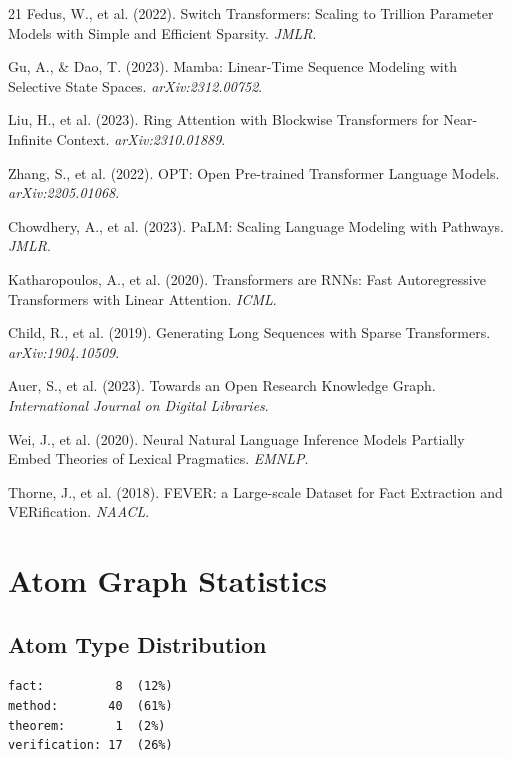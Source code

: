 \documentclass[11pt,a4paper]{article}
\begin{document}
\begin{thebibliography}{21}
Fedus, W., et al. (2022). Switch Transformers: Scaling to Trillion Parameter Models with Simple and Efficient Sparsity. \textit{JMLR}.

Gu, A., \& Dao, T. (2023). Mamba: Linear-Time Sequence Modeling with Selective State Spaces. \textit{arXiv:2312.00752}.

Liu, H., et al. (2023). Ring Attention with Blockwise Transformers for Near-Infinite Context. \textit{arXiv:2310.01889}.

Zhang, S., et al. (2022). OPT: Open Pre-trained Transformer Language Models. \textit{arXiv:2205.01068}.

Chowdhery, A., et al. (2023). PaLM: Scaling Language Modeling with Pathways. \textit{JMLR}.

Katharopoulos, A., et al. (2020). Transformers are RNNs: Fast Autoregressive Transformers with Linear Attention. \textit{ICML}.

Child, R., et al. (2019). Generating Long Sequences with Sparse Transformers. \textit{arXiv:1904.10509}.

Auer, S., et al. (2023). Towards an Open Research Knowledge Graph. \textit{International Journal on Digital Libraries}.

Wei, J., et al. (2020). Neural Natural Language Inference Models Partially Embed Theories of Lexical Pragmatics. \textit{EMNLP}.

Thorne, J., et al. (2018). FEVER: a Large-scale Dataset for Fact Extraction and VERification. \textit{NAACL}.

\end{thebibliography}

\appendix

\section{Atom Graph Statistics}
\label{app:atoms}

\subsection{Atom Type Distribution}

\begin{verbatim}
fact:          8  (12%)
method:       40  (61%)
theorem:       1  (2%)
verification: 17  (26%)
\end{verbatim}
\end{document}
